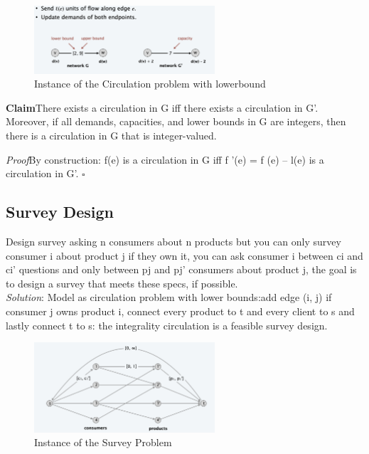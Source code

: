 \documentclass[11pt]{article}
\newenvironment{claim}[1]{\par\textbf{Claim}\space#1}{}
\newenvironment{proof}[1]{\par\textit{Proof}\space#1}{\hfill\ensuremath{\square}}
\begin{document}
\begin{figure}[H]
		\centering
		\includegraphics[width=0.6\textwidth ]{lowerbound}
		\caption{Instance of the Circulation problem with lowerbound}
\end{figure}

\begin{claim}
There exists a circulation in G iff there exists a circulation in G'. Moreover, if all demands, capacities, and lower bounds in G are integers, then there is a circulation in G that is integer-valued.
\end{claim}\\

\begin{proof}
By construction: f(e) is a circulation in G iff f '(e) = f (e) – l(e) is a circulation in G'.
\end{proof}\\

\subsection{Survey Design}

Design survey asking n consumers about n products but you can only survey consumer i about product j if they own it, you can ask consumer i between ci and ci' questions and only between pj and pj' consumers about product j, the goal is to design a survey that meets these specs, if possible.\\

\emph{Solution}: Model as circulation problem with lower bounds:add edge (i, j) if consumer j owns product i, connect every product to t and every client to s and lastly connect t to s: the integrality circulation is a feasible survey design.

\begin{figure}[H]
		\centering
		\includegraphics[width=0.6\textwidth ]{survey}
		\caption{Instance of the Survey Problem}
\end{figure}
\end{document}
